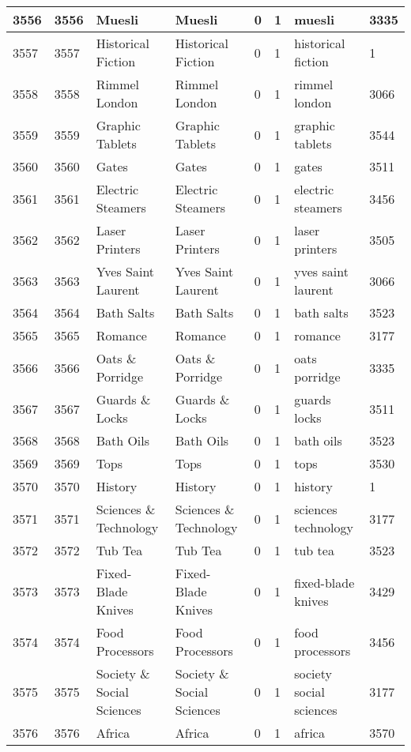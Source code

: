 \begin{longtable}{|l|l|l|l|l|l|l|l|}
3556 & 3556 & Muesli & Muesli & 0 & 1 & muesli & 3335 \\ \hline 
3557 & 3557 & Historical Fiction & Historical Fiction & 0 & 1 & historical fiction & 1 \\ \hline 
3558 & 3558 & Rimmel London & Rimmel London & 0 & 1 & rimmel london & 3066 \\ \hline 
3559 & 3559 & Graphic Tablets & Graphic Tablets & 0 & 1 & graphic tablets & 3544 \\ \hline 
3560 & 3560 & Gates & Gates & 0 & 1 & gates & 3511 \\ \hline 
3561 & 3561 & Electric Steamers & Electric Steamers & 0 & 1 & electric steamers & 3456 \\ \hline 
3562 & 3562 & Laser Printers & Laser Printers & 0 & 1 & laser printers & 3505 \\ \hline 
3563 & 3563 & Yves Saint Laurent & Yves Saint Laurent & 0 & 1 & yves saint laurent & 3066 \\ \hline 
3564 & 3564 & Bath Salts & Bath Salts & 0 & 1 & bath salts & 3523 \\ \hline 
3565 & 3565 & Romance & Romance & 0 & 1 & romance & 3177 \\ \hline 
3566 & 3566 & Oats \& Porridge & Oats \& Porridge & 0 & 1 & oats porridge & 3335 \\ \hline 
3567 & 3567 & Guards \& Locks & Guards \& Locks & 0 & 1 & guards locks & 3511 \\ \hline 
3568 & 3568 & Bath Oils & Bath Oils & 0 & 1 & bath oils & 3523 \\ \hline 
3569 & 3569 & Tops & Tops & 0 & 1 & tops & 3530 \\ \hline 
3570 & 3570 & History & History & 0 & 1 & history & 1 \\ \hline 
3571 & 3571 & Sciences \& Technology & Sciences \& Technology & 0 & 1 & sciences technology & 3177 \\ \hline 
3572 & 3572 & Tub Tea & Tub Tea & 0 & 1 & tub tea & 3523 \\ \hline 
3573 & 3573 & Fixed-Blade Knives & Fixed-Blade Knives & 0 & 1 & fixed-blade knives & 3429 \\ \hline 
3574 & 3574 & Food Processors & Food Processors & 0 & 1 & food processors & 3456 \\ \hline 
3575 & 3575 & Society \& Social Sciences & Society \& Social Sciences & 0 & 1 & society social sciences & 3177 \\ \hline 
3576 & 3576 & Africa & Africa & 0 & 1 & africa & 3570 \\ \hline 

\end{longtable}

